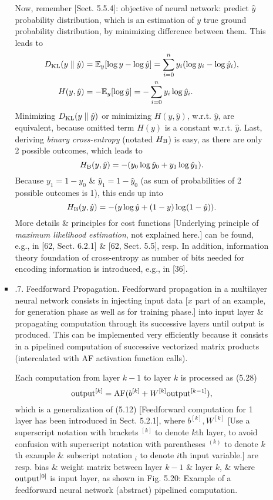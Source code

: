 \documentclass{article}
\begin{document}
\begin{itemize}
\begin{itemize}
\begin{itemize}
			Now, remember [Sect. 5.5.4]: objective of neural network: predict $\hat{y}$ probability distribution, which is an estimation of $y$ true ground probability distribution, by minimizing difference between them. This leads to
			\begin{align*}
				D_{\rm KL}(y\parallel\hat{y}) &= \mathbb{E}_y[\log y - \log\hat{y}] = \sum_{i=0}^n y_i(\log y_i - \log\hat{y}_i),\\
				H(y,\hat{y}) &= -\mathbb{E}_y[\log\hat{y}] = -\sum_{i=0}^n y_i\log\hat{y}_i.
			\end{align*}
			Minimizing $D_{\rm KL}(y\parallel\hat{y})$ or minimizing $H(y,\hat{y})$, w.r.t. $\hat{y}$, are equivalent, because omitted term $H(y)$ is a constant w.r.t. $\hat{y}$. Last, deriving {\it binary cross-entropy} (notated $H_{\rm B}$) is easy, as there are only 2 possible outcomes, which leads to
			\begin{equation*}
				H_{\rm B}(y,\hat{y}) = -(y_0\log\hat{y}_0 + y_1\log\hat{y}_1).
			\end{equation*}
			Because $y_1 = 1 - y_0$ \& $\hat{y}_1 = 1 - \hat{y}_0$ (as sum of probabilities of 2 possible outcomes is 1), this ends up into
			\begin{equation*}
				H_{\rm B}(y,\hat{y}) = -(y\log\hat{y} + (1 - y)\log(1 - \hat{y})).
			\end{equation*}
			More details \& principles for cost functions [Underlying principle of {\it maximum likelihood estimation}, not explained here.] can be found, e.g., in [62, Sect. 6.2.1] \& [62, Sect. 5.5], resp. In addition, information theory foundation of cross-entropy as number of bits needed for encoding information is introduced, e.g., in [36].			
			\item {.7. Feedforward Propagation.} Feedforward propagation in a multilayer neural network consists in injecting input data [$x$ part of an example, for generation phase as well as for training phase.] into input layer \& propagating computation through its successive layers until output is produced. This can be implemented very efficiently because it consists in a pipelined computation of successive vectorized matrix products (intercalated with AF activation function calls).
			
			Each computation from layer $k - 1$ to layer $k$ is processed as (5.28)
			\begin{equation*}
				{\rm output}^{[k]} = {\rm AF}(b^{[k]} + W^{[k]}{\rm output}^{[k-1]}),
			\end{equation*}
			which is a generalization of (5.12) [Feedforward computation for 1 layer has been introduced in Sect. 5.2.1], where $b^{[k]},W^{[k]}$ [Use a superscript notation with brackets ${}^{[k]}$ to denote $k$th layer, to avoid confusion with superscript notation with parentheses ${}^{(k)}$ to denote $k$th example \& subscript notation ${}_i$ to denote $i$th input variable.] are resp. bias \& weight matrix between layer $k - 1$ \& layer $k$, \& where ${\rm output}^{[0]}$ is input layer, as shown in {\sf Fig. 5.20: Example of a feedforward neural network (abstract) pipelined computation.}
			

\end{itemize}
\end{itemize}
\end{itemize}
\end{document}
